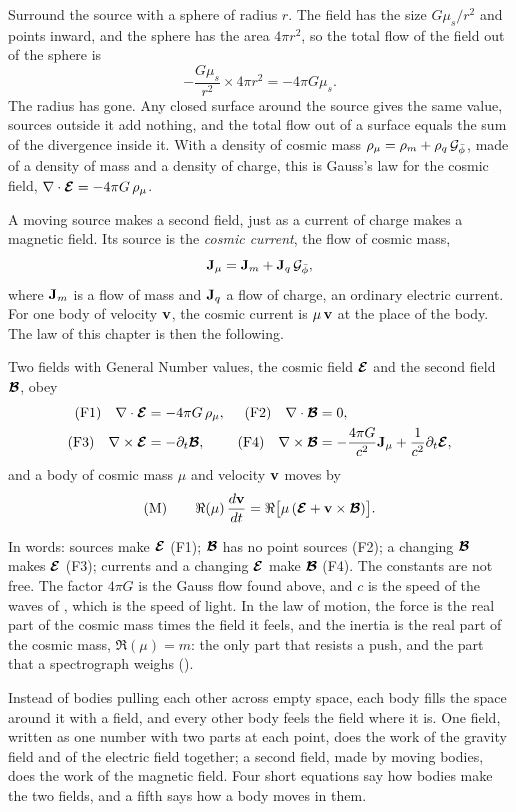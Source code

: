 Surround the source with a sphere of radius $r$. The field has the size $G\mu_s/r^2$ and points inward, and the sphere has the area $4\pi r^2$, so the total flow of the field out of the sphere is
\[
-\frac{G\mu_s}{r^2} \times 4\pi r^2 = -4\pi G\mu_s .
\]
The radius has gone. Any closed surface around the source gives the same value, sources outside it add nothing, and the total flow out of a surface equals the sum of the divergence inside it. With a density of cosmic mass $\rho_\mu = \rho_m + \rho_q\,\mathcal{G}_{\bar{\phi}}$, made of a density of mass and a density of charge, this is Gauss's law for the cosmic field, $\nabla\cdot\boldsymbol{\mathcal{E}} = -4\pi G\,\rho_\mu$.

A moving source makes a second field, just as a current of charge makes a magnetic field. Its source is the \emph{cosmic current}, the flow of cosmic mass,
\[
\mathbf{J}_\mu = \mathbf{J}_m + \mathbf{J}_q\,\mathcal{G}_{\bar{\phi}} ,
\]
where $\mathbf{J}_m$ is a flow of mass and $\mathbf{J}_q$ a flow of charge, an ordinary electric current. For one body of velocity $\mathbf{v}$, the cosmic current is $\mu\,\mathbf{v}$ at the place of the body. The law of this chapter is then the following.

\begin{law}\label{law:unified}
Two fields with General Number values, the cosmic field $\boldsymbol{\mathcal{E}}$ and the second field $\boldsymbol{\mathcal{B}}$, obey
\begin{align*}
\text{(F1)}\quad \nabla\cdot\boldsymbol{\mathcal{E}} &= -4\pi G\,\rho_\mu , & \text{(F2)}\quad \nabla\cdot\boldsymbol{\mathcal{B}} &= 0 ,\\
\text{(F3)}\quad \nabla\times\boldsymbol{\mathcal{E}} &= -\partial_t\boldsymbol{\mathcal{B}} , & \text{(F4)}\quad \nabla\times\boldsymbol{\mathcal{B}} &= -\frac{4\pi G}{c^2}\mathbf{J}_\mu + \frac{1}{c^2}\partial_t\boldsymbol{\mathcal{E}} ,
\end{align*}
and a body of cosmic mass $\mu$ and velocity $\mathbf{v}$ moves by
\[
\text{(M)}\qquad \Re(\mu)\,\frac{d\mathbf{v}}{dt} = \Re\bigl[\mu\,(\boldsymbol{\mathcal{E}} + \mathbf{v}\times\boldsymbol{\mathcal{B}})\bigr] .
\]
\end{law}

In words: sources make $\boldsymbol{\mathcal{E}}$ (F1); $\boldsymbol{\mathcal{B}}$ has no point sources (F2); a changing $\boldsymbol{\mathcal{B}}$ makes $\boldsymbol{\mathcal{E}}$ (F3); currents and a changing $\boldsymbol{\mathcal{E}}$ make $\boldsymbol{\mathcal{B}}$ (F4). The constants are not free. The factor $4\pi G$ is the Gauss flow found above, and $c$ is the speed of the waves of , which is the speed of light. In the law of motion, the force is the real part of the cosmic mass times the field it feels, and the inertia is the real part of the cosmic mass, $\Re(\mu) = m$: the only part that resists a push, and the part that a spectrograph weighs ().

\begin{plainwords}
Instead of bodies pulling each other across empty space, each body fills the space around it with a field, and every other body feels the field where it is. One field, written as one number with two parts at each point, does the work of the gravity field and of the electric field together; a second field, made by moving bodies, does the work of the magnetic field. Four short equations say how bodies make the two fields, and a fifth says how a body moves in them.
\end{plainwords}

